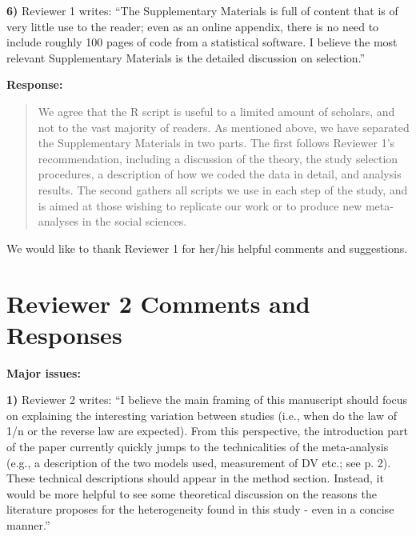 \documentclass[a4paper,12pt]{article}
\begin{document}
\vspace{.3cm}

\noindent \textbf{6)} Reviewer 1 writes: ``The Supplementary Materials is full of content that is of very little use to the reader; even as an online appendix, there is no need to include roughly 100 pages of code from a statistical software. I believe the most relevant Supplementary Materials is the detailed discussion on selection.''

\vspace{.3cm}

\noindent \textbf{Response:} 
\begin{quote}
    We agree that the R script is useful to a limited amount of scholars, and not to the vast majority of readers. As mentioned above, we have separated the Supplementary Materials in two parts. The first follows Reviewer 1's recommendation, including a discussion of the theory, the study selection procedures, a description of how we coded the data in detail, and analysis results. The second gathers all scripts we use in each step of the study, and is aimed at those wishing to replicate our work or to produce new meta-analyses in the social sciences.
\end{quote}

\vspace{.3cm}

We would like to thank Reviewer 1 for her/his helpful comments and suggestions.

\section*{Reviewer 2 Comments and Responses}

\textbf{Major issues:}

\noindent \textbf{1)} Reviewer 2 writes: ``I believe the main framing of this manuscript should focus on explaining the interesting variation between studies (i.e., when do the law of 1/n or the reverse law are expected). From this perspective, the introduction part of the paper currently quickly jumps to the technicalities of the meta-analysis (e.g., a description of the two models used, measurement of DV etc.; see p. 2). These technical descriptions should appear in the method section. Instead, it would be more helpful to see some theoretical discussion on the reasons the literature proposes for the heterogeneity found in this study - even in a concise manner.''

\vspace{.3cm}
\end{document}
